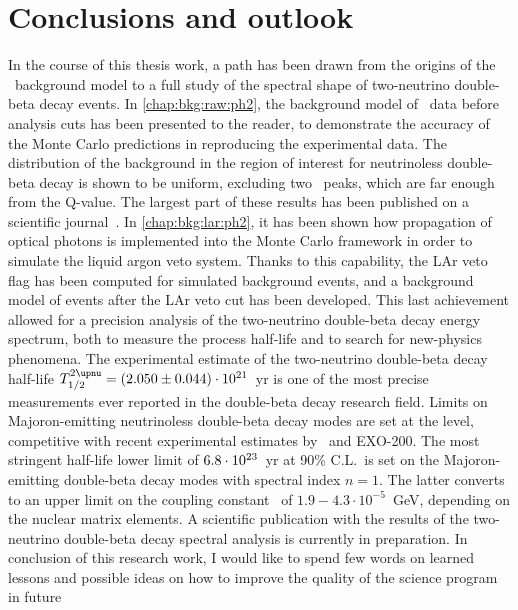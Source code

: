 
\chapter*{Conclusions and outlook}%
\label{chap:concl}

In the course of this thesis work, a path has been drawn from the origins of the \gerda\
background model to a full study of the spectral shape of two-neutrino double-beta decay
events. In \cref{chap:bkg:raw:ph2}, the background model of \gerdatwo\ data before
analysis cuts has been presented to the reader, to demonstrate the accuracy of the Monte
Carlo predictions in reproducing the experimental data. The distribution of the background
in the region of interest for neutrinoless double-beta decay is shown to be uniform,
excluding two \g\ peaks, which are far enough from the Q-value. The largest part of these
results has been published on a scientific journal~\cite{Agostini2019b}. In
\cref{chap:bkg:lar:ph2}, it has been shown how propagation of optical photons is
implemented into the Monte Carlo framework in order to simulate the liquid argon veto
system. Thanks to this capability, the LAr veto flag has been computed for simulated
background events, and a background model of events after the LAr veto cut has been
developed. This last achievement allowed for a precision analysis of the two-neutrino
double-beta decay energy spectrum, both to measure the process half-life and to search for
new-physics phenomena. The experimental estimate of the two-neutrino double-beta decay
half-life $\thalftwoM = \thalftwovalueshort$~yr is one of the most precise measurements
ever reported in the double-beta decay research field. Limits on Majoron-emitting
neutrinoless double-beta decay modes are set at the \powtenyr{23} level, competitive with
recent experimental estimates by \kamlandzen\ and EXO-200. The most stringent half-life
lower limit of $6.8 \cdot 10^{23}$~yr at 90\% C.L.~is set on the Majoron-emitting
double-beta decay modes with spectral index $n=1$. The latter converts to an upper limit
on the coupling constant \ga\ of $1.9{-}4.3 \cdot 10^{-5}$~GeV, depending on the nuclear
matrix elements. A scientific publication with the results of the two-neutrino double-beta
decay spectral analysis is currently in preparation.
\newpar
In conclusion of this research work, I would like to spend few words on learned lessons
and possible ideas on how to improve the quality of the science program in future
